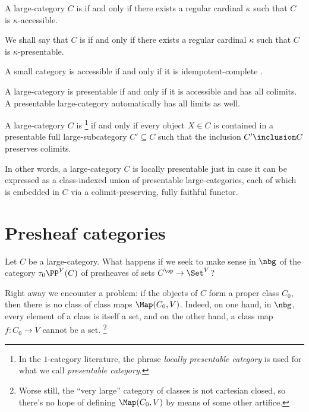 \begin{definition}
	A large-category $ C $ is  if and only if
	there exists a regular cardinal $ \kappa $ such that
	$ C $ is $ \kappa $-accessible.

	We shall say that $ C $ is  if and only if
	there exists a regular cardinal $ \kappa $ such that
	$ C $ is $ \kappa $-presentable.
\end{definition}

\begin{eg}
	A small category is accessible if and only if it is idempotent-complete
	\citep[Corollary 5.4.3.6]{Lurie2009}.
\end{eg}

\begin{nul}
	A large-category is presentable if and only if
	it is accessible and has all colimits.
	A presentable large-category automatically has all limits as well.
\end{nul}

\begin{definition}%
	\label{dfn:locallypresentable}
	A large-category $ C $ is %
	\footnote{In the $1$-category literature,
		the phrase \emph{locally presentable category} is used for
		what we call \emph{presentable category}.}
	if and only if every object $ X \in C $
	is contained in a presentable full large-subcategory $ C' \subseteq C $
	such that the inclusion $ C' \inclusion C $ preserves colimits.
\end{definition}

\begin{nul}
	In other words, a large-category $ C $ is locally presentable
	just in case it can be expressed as
	a class-indexed union of presentable large-categories,
	each of which is embedded in $ C $ via
	a colimit-preserving, fully faithful functor.
\end{nul}

\section{Presheaf categories}%
\label{sec:presheaf_categories}

Let $ C $ be a large-category.
What happens if we seek to make sense in $ \nbg $
of the category $ \tau_0\PP^V(C) $ of presheaves of sets
$ C^{\op} \to \Set^V $?

Right away we encounter a problem:
if the objects of $ C $ form a proper class $ C_ 0 $,
then there is no class of class maps $ \Map(C_0, V) $.
Indeed, on one hand, in $ \nbg $, every element of a class is itself a set,
and on the other hand, a class map $ f \colon C_0 \to V $ cannot be a set.%
\footnote{Worse still, the \enquote{very large}
	category of classes is not cartesian closed,
	so there's no hope of defining
	$ \Map(C_0, V) $ by means of some other artifice.}

